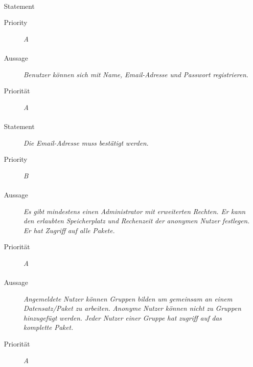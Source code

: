 

\paragraph{}
\begin{description}
  \item [Statement] 
    \textit{}
  \item [Priority] \textit{A}
\end{description}

\paragraph{}
\begin{description}
\item [Aussage] \textit{Benutzer können sich mit Name, Email-Adresse und Passwort registrieren.}
\item [Priorität] \textit{A}
\end{description}

\paragraph{}
\begin{description}
  \item [Statement] 
    \textit{Die Email-Adresse muss bestätigt werden.}
  \item [Priority] \textit{B}
\end{description}


\paragraph{}
\begin{description}
\item[Aussage] \textit{Es gibt mindestens einen Administrator mit erweiterten Rechten. Er kann den erlaubten Speicherplatz und Rechenzeit der anonymen Nutzer festlegen. Er hat Zugriff auf alle Pakete.}
\item[Priorität] \textit{A}
\end{description}

\paragraph{}
\begin{description}
\item[Aussage] \textit{Angemeldete Nutzer können Gruppen bilden um gemeinsam an einem Datensatz/Paket zu arbeiten. Anonyme Nutzer können nicht zu Gruppen hinzugefügt werden. Jeder Nutzer einer Gruppe hat zugriff auf das komplette Paket.}
\item[Priorität] \textit{A}
\end{description}


